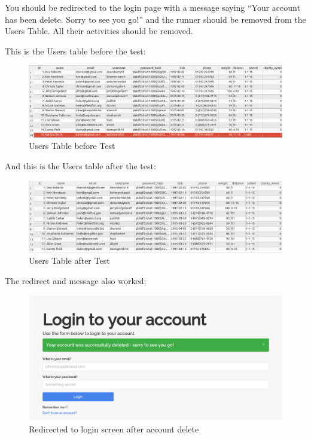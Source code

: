 \documentclass{article}[12pt,a4paper]
\begin{document}
You should be redirected to the login page with a message saying ``Your account has been delete. Sorry to see you go!'' and the runner should be removed from the Users Table. All their activities should be removed.

This is the Users table before the test:

\begin{figure}[h!]
    \includegraphics[scale=0.33]{images/testing/add_user/database_after_broken}
    \caption{Users Table before Test}
\end{figure}

\clearpage

And this is the Users table after the test:

\begin{figure}[h!]
    \includegraphics[scale=0.33]{images/testing/add_user/database_before}
    \caption{Users Table after Test}
\end{figure}

The redirect and message also worked:

\begin{figure}[h!]
    \includegraphics[scale=0.33]{images/testing/delete_user/sorry}
    \caption{Redirected to login screen after account delete}
\end{figure}
\end{document}
